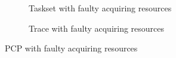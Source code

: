 \begin{figure}[htbp]
    \centering
    \begin{subfigure}{0.45\textwidth}
        \vfill
        \centering
        \caption{Taskset with faulty acquiring resources}
        \label{fig:tasksetFaultAcquiringResources}
        \vfill
    \end{subfigure}
    \hfill
    \begin{subfigure}{0.45\textwidth}
        \vfill
        \centering
        \caption{Trace with faulty acquiring resources}
        \label{fig:traceFaultAcquiringResources}
        \vfill
    \end{subfigure}
    \caption{PCP with faulty acquiring resources}
\end{figure}